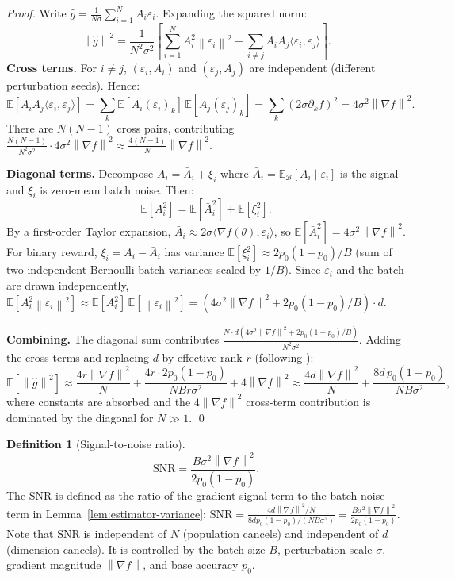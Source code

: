 \documentclass[11pt]{article}
\theoremstyle{definition}
\newtheorem{definition}{Definition}
\theoremstyle{remark}
\newcommand{\E}{\mathbb{E}}
\newcommand{\norm}[1]{\left\|#1\right\|}
\newcommand{\SNR}{\mathrm{SNR}}
\begin{document}
\begin{proof}
Write $\hat{g} = \frac{1}{N\sigma}\sum_{i=1}^{N} A_i \varepsilon_i$. Expanding the squared norm:
\[
  \norm{\hat{g}}^2 = \frac{1}{N^2\sigma^2}\left[\sum_{i=1}^N A_i^2\norm{\varepsilon_i}^2 + \sum_{i \neq j} A_i A_j \langle\varepsilon_i, \varepsilon_j\rangle\right].
\]
\textbf{Cross terms.} For $i \neq j$, $(\varepsilon_i, A_i)$ and $(\varepsilon_j, A_j)$ are independent (different perturbation seeds). Hence:
\[
  \E[A_i A_j \langle\varepsilon_i,\varepsilon_j\rangle] = \sum_k \E[A_i(\varepsilon_i)_k]\,\E[A_j(\varepsilon_j)_k]
  = \sum_k (2\sigma\partial_k f)^2 = 4\sigma^2\norm{\nabla f}^2.
\]
There are $N(N-1)$ cross pairs, contributing $\frac{N(N-1)}{N^2\sigma^2}\cdot 4\sigma^2\norm{\nabla f}^2 \approx \frac{4(N-1)}{N}\norm{\nabla f}^2$.

\textbf{Diagonal terms.} Decompose $A_i = \bar{A}_i + \xi_i$ where $\bar{A}_i = \E_\mathcal{B}[A_i \mid \varepsilon_i]$ is the signal and $\xi_i$ is zero-mean batch noise. Then:
\[
  \E[A_i^2] = \E[\bar{A}_i^2] + \E[\xi_i^2].
\]
By a first-order Taylor expansion, $\bar{A}_i \approx 2\sigma\langle\nabla f(\theta),\varepsilon_i\rangle$, so $\E[\bar{A}_i^2] = 4\sigma^2\norm{\nabla f}^2$.
For binary reward, $\xi_i = A_i - \bar{A}_i$ has variance $\E[\xi_i^2] \approx 2p_0(1-p_0)/B$ (sum of two independent Bernoulli batch variances scaled by $1/B$).
Since $\varepsilon_i$ and the batch are drawn independently, $\E[A_i^2\norm{\varepsilon_i}^2] \approx \E[A_i^2]\,\E[\norm{\varepsilon_i}^2] = (4\sigma^2\norm{\nabla f}^2 + 2p_0(1-p_0)/B)\cdot d$.

\textbf{Combining.} The diagonal sum contributes $\frac{N \cdot d(4\sigma^2\norm{\nabla f}^2 + 2p_0(1-p_0)/B)}{N^2\sigma^2}$. Adding the cross terms and replacing $d$ by effective rank $r$ (following \citet{liang2026blessing}):
\[
  \E\!\left[\norm{\hat{g}}^2\right] \approx \frac{4r\norm{\nabla f}^2}{N} + \frac{4r\cdot 2p_0(1-p_0)}{NBr\sigma^2} + 4\norm{\nabla f}^2
  \approx \frac{4d\norm{\nabla f}^2}{N} + \frac{8d\,p_0(1-p_0)}{NB\sigma^2},
\]
where constants are absorbed and the $4\norm{\nabla f}^2$ cross-term contribution is dominated by the diagonal for $N \gg 1$. \qed
\end{proof}

\begin{definition}[Signal-to-noise ratio]
\begin{equation}
  \SNR = \frac{B\sigma^2\norm{\nabla f}^2}{2p_0(1-p_0)}.
  \label{eq:snr}
\end{equation}
The SNR is defined as the ratio of the gradient-signal term to the batch-noise term in Lemma~\ref{lem:estimator-variance}: $\mathrm{SNR} = \frac{4d\norm{\nabla f}^2/N}{8dp_0(1-p_0)/(NB\sigma^2)} = \frac{B\sigma^2\norm{\nabla f}^2}{2p_0(1-p_0)}$. Note that $\mathrm{SNR}$ is independent of $N$ (population cancels) and independent of $d$ (dimension cancels). It is controlled by the batch size $B$, perturbation scale $\sigma$, gradient magnitude $\norm{\nabla f}$, and base accuracy $p_0$.
\end{definition}
\end{document}
